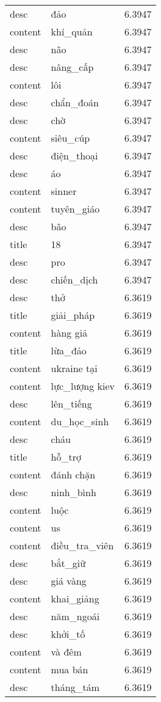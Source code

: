\documentclass{article}
\begin{document}
\begin{tabular}{lll}
desc & đảo & 6.3947\\
content & khí\_quản & 6.3947\\
desc & não & 6.3947\\
desc & nâng\_cấp & 6.3947\\
content & lôi & 6.3947\\
desc & chẩn\_đoán & 6.3947\\
desc & chờ & 6.3947\\
content & siêu\_cúp & 6.3947\\
desc & điện\_thoại & 6.3947\\
desc & áo & 6.3947\\
content & sinner & 6.3947\\
content & tuyên\_giáo & 6.3947\\
desc & bão & 6.3947\\
title & 18 & 6.3947\\
desc & pro & 6.3947\\
desc & chiến\_dịch & 6.3947\\
desc & thở & 6.3619\\
title & giải\_pháp & 6.3619\\
content & hàng giả & 6.3619\\
title & lừa\_đảo & 6.3619\\
content & ukraine tại & 6.3619\\
content & lực\_lượng kiev & 6.3619\\
desc & lên\_tiếng & 6.3619\\
content & du\_học\_sinh & 6.3619\\
desc & cháu & 6.3619\\
title & hỗ\_trợ & 6.3619\\
content & đánh chặn & 6.3619\\
desc & ninh\_bình & 6.3619\\
content & luộc & 6.3619\\
content & us & 6.3619\\
content & điều\_tra\_viên & 6.3619\\
desc & bắt\_giữ & 6.3619\\
desc & giá vàng & 6.3619\\
content & khai\_giảng & 6.3619\\
desc & năm\_ngoái & 6.3619\\
desc & khởi\_tố & 6.3619\\
content & và đêm & 6.3619\\
content & mua bán & 6.3619\\
desc & tháng\_tám & 6.3619\\

\end{tabular}
\end{document}
